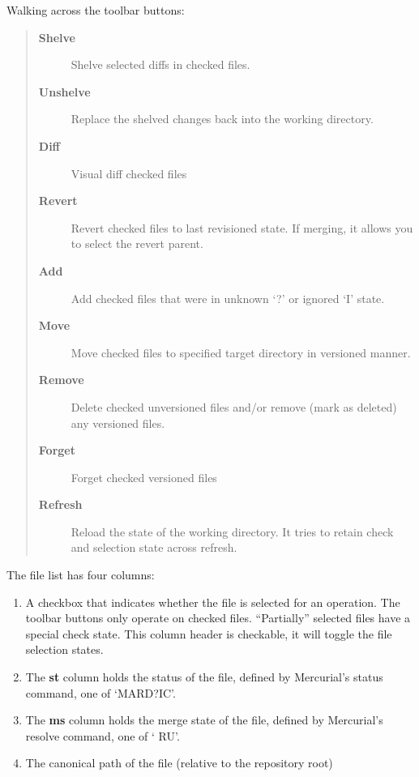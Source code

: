 \documentclass[letterpaper,10pt,english]{manual}
\begin{document}
Walking across the toolbar buttons:
\begin{quote}
\begin{description}
\item[\textbf{Shelve}]
Shelve selected diffs in checked files.

\item[\textbf{Unshelve}]
Replace the shelved changes back into the working directory.

\item[\textbf{Diff}]
Visual diff checked files

\item[\textbf{Revert}]
Revert checked files to last revisioned state.  If merging, it
allows you to select the revert parent.

\item[\textbf{Add}]
Add checked files that were in unknown `?' or ignored `I' state.

\item[\textbf{Move}]
Move checked files to specified target directory in versioned
manner.

\item[\textbf{Remove}]
Delete checked unversioned files and/or remove (mark as deleted) any
versioned files.

\item[\textbf{Forget}]
Forget checked versioned files

\item[\textbf{Refresh}]
Reload the state of the working directory. It tries to retain
check and selection state across refresh.

\end{description}
\end{quote}

The file list has four columns:
\begin{enumerate}
\item {} 
A checkbox that indicates whether the file is selected for an
operation.  The toolbar buttons only operate on checked files.
``Partially'' selected files have a special check state.  This
column header is checkable, it will toggle the file selection
states.

\item {} 
The \textbf{st} column holds the status of the file, defined
by Mercurial's status command, one of `MARD?IC'.

\item {} 
The \textbf{ms} column holds the merge state of the file,
defined by Mercurial's resolve command, one of ` RU'.

\item {} 
The canonical path of the file (relative to the repository root)

\end{enumerate}
\end{document}
